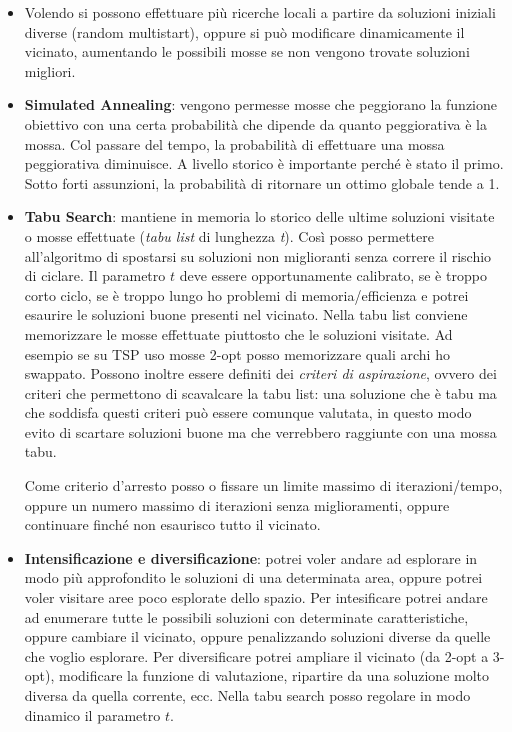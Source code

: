 \begin{itemize}
	\item Volendo si possono effettuare più ricerche locali a partire da soluzioni iniziali diverse (random multistart), oppure si può modificare dinamicamente il vicinato, aumentando le possibili mosse se non vengono trovate soluzioni migliori.
	
	\item \textbf{Simulated Annealing}: vengono permesse mosse che peggiorano la funzione obiettivo con una certa probabilità che dipende da quanto peggiorativa è la mossa. Col passare del tempo, la probabilità di effettuare una mossa peggiorativa diminuisce. A livello storico è importante perché è stato il primo. Sotto forti assunzioni, la probabilità di ritornare un ottimo globale tende a 1.
	
	\item \textbf{Tabu Search}: mantiene in memoria lo storico delle ultime soluzioni visitate o mosse effettuate (\textit{tabu list} di lunghezza \textit{t}). Così posso permettere all'algoritmo di spostarsi su soluzioni non miglioranti senza correre il rischio di ciclare. Il parametro $t$ deve essere opportunamente calibrato, se è troppo corto ciclo, se è troppo lungo ho problemi di memoria/efficienza e potrei esaurire le soluzioni buone presenti nel vicinato. Nella tabu list conviene memorizzare le mosse effettuate piuttosto che le soluzioni visitate. Ad esempio se su TSP uso mosse 2-opt posso memorizzare quali archi ho swappato.
	Possono inoltre essere definiti dei \textit{criteri di aspirazione}, ovvero dei criteri che permettono di scavalcare la tabu list: una soluzione che è tabu ma che soddisfa questi criteri può essere comunque valutata, in questo modo evito di scartare soluzioni buone ma che verrebbero raggiunte con una mossa tabu.
	
	Come criterio d'arresto posso o fissare un limite massimo di iterazioni/tempo, oppure un numero massimo di iterazioni senza miglioramenti, oppure continuare finché non esaurisco tutto il vicinato.
	
	\item \textbf{Intensificazione e diversificazione}: potrei voler andare ad esplorare in modo più approfondito le soluzioni di una determinata area, oppure potrei voler visitare aree poco esplorate dello spazio. Per intesificare potrei andare ad enumerare tutte le possibili soluzioni con determinate caratteristiche, oppure cambiare il vicinato, oppure penalizzando soluzioni diverse da quelle che voglio esplorare. Per diversificare potrei ampliare il vicinato (da 2-opt a 3-opt), modificare la funzione di valutazione, ripartire da una soluzione molto diversa da quella corrente, ecc. Nella tabu search posso regolare in modo dinamico il parametro $t$.
\end{itemize}

